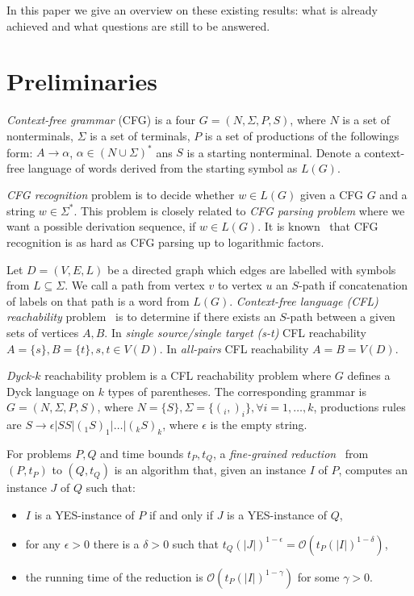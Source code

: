 \documentclass[acmsmall,nonacm]{acmart}
\begin{document}
	In this paper we give an overview on these existing results: what is already achieved and what questions are still to be answered.

	\section{Preliminaries}

	\emph{Context-free grammar} (CFG) is a four $G=(N, \Sigma, P, S)$, where $N$ is a set of nonterminals, $\Sigma$ is a set of terminals, $P$ is a set of productions of the followings form: $A \to \alpha$, $\alpha \in (N \cup \Sigma)^*$ ans $S$ is a starting nonterminal. Denote a context-free language of words derived from the starting symbol as $L(G)$.

	\emph{CFG recognition} problem is to decide whether $w \in L(G)$ given a CFG $G$ and a string $w \in \Sigma^*$. This problem is closely related to \emph{CFG parsing problem} where we want a possible derivation sequence, if $w \in L(G)$. It is known~\cite{10.5555/646233.682379} that CFG recognition is as hard as CFG parsing up to logarithmic factors.

	Let $D = (V, E, L)$ be a directed graph which edges are labelled with symbols from $L \subseteq \Sigma$. We call a path from vertex $v$ to vertex $u$ an $S$-path if concatenation of labels on that path is a word from $L(G)$.  \emph{Context-free language (CFL) reachability} problem~\cite{REPS1998701} is to determine if there exists an $S$-path between a given sets of vertices $A, B$. In \emph{single source/single target (s-t)} CFL reachability $A = \{s\}, B = \{t\}, s, t \in V(D)$. In \emph{all-pairs} CFL reachability $A = B = V(D)$.

	\emph{Dyck-$k$} reachability problem is a CFL reachability problem where $G$ defines a Dyck language on $k$ types of parentheses. The corresponding grammar is $G=(N, \Sigma, P, S)$, where $N = \{S\}, \Sigma = \{(_i, )_i\}, \forall i = 1, \ldots, k$, productions rules are $S \rightarrow \epsilon | SS | (_1 S )_1 | \ldots | (_k S )_k$, where $\epsilon$ is the empty string. 

	For problems $P, Q$ and time bounds $t_P, t_Q$, a \emph{fine-grained reduction}~\cite{bringmann2019fine} from $(P, t_P)$ to $(Q, t_Q)$ is an algorithm that, given an instance $I$ of $P$, computes an instance $J$ of $Q$ such that: 
	
	\begin{itemize}
		\item $I$ is a YES-instance of $P$ if and only if $J$ is a YES-instance of $Q$,
		\item for any $\epsilon > 0$ there is a $\delta > 0$ such that $t_Q(|J|)^{1 - \epsilon} = \mathcal{O}(t_P (|I|)^{1 - \delta})$, 
		\item the running time of the reduction is $\mathcal{O}(t_P (|I|)^{1 - \gamma})$ for some $\gamma > 0$.
	\end{itemize}
\end{document}
